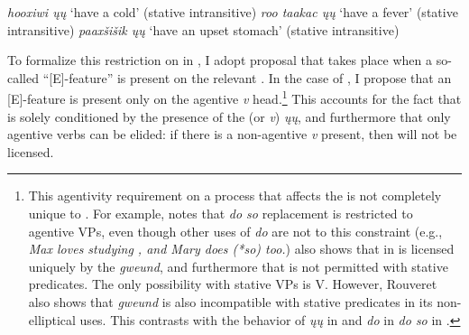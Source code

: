 \documentclass[output=paper]{LSP/langsci}
\begin{document}
 
\ea\label{ex:johnson:23}
\ea 
\textit{hooxiwi ųų} `have a cold' (stative intransitive)
\vspace{12pt}
\ex 
\textit{roo taakac ųų} `have a fever' (stative intransitive)
\vspace{12pt}
\ex 
\textit{paaxšišik ųų} `have an upset stomach' (stative intransitive)\\
\citep{Hartmann2012}
\z
\z

To formalize this restriction on  in , I adopt  proposal that  takes place when a so-called ``[E]-feature'' is present on the relevant . In the case of , I propose that an [E]-feature is present only on the agentive \emph{v} head.\footnote{This agentivity requirement on a process that affects the  is not completely unique to . For example, \citet{Hallman2004} notes that  \emph{do so} replacement is restricted to agentive VPs, even though other uses of \emph{do} are not  to this constraint (e.g., \emph{Max loves studying , and Mary does (*so) too.}) \citet{Rouveret2012} also shows that  in  is licensed uniquely by the  \emph{gweund}, and furthermore that  is not permitted with stative predicates. The only possibility with stative VPs is V. However, Rouveret also shows that \emph{gweund} is also incompatible with stative predicates in its non-elliptical uses. This contrasts with the behavior of \emph{ųų} in  and \emph{do} in \emph{do so} in .}  This accounts for the fact that  is solely conditioned by the presence of the  (or \emph{v}) \emph{ųų}, and furthermore that only agentive verbs can be elided: if there is a non-agentive \emph{v} present, then  will not be licensed. 
\end{document}
